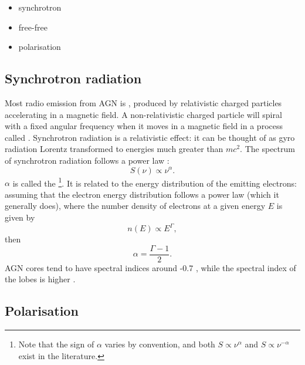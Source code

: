     \begin{itemize}
        \item synchrotron
        \item free-free
        \item polarisation
    \end{itemize}

    \subsection{Synchrotron radiation}
    \label{sec:synchrotron}

        Most radio emission from AGN is , produced by relativistic charged particles accelerating in a magnetic field. A non-relativistic charged particle will spiral with a fixed angular frequency when it moves in a magnetic field in a process called . Synchrotron radiation is a relativistic effect: it can be thought of as gyro radiation Lorentz transformed to energies much greater than $mc^2$. The spectrum of synchrotron radiation follows a power law \citep{condon_essential_2016}:
        \begin{equation}
            \label{eq:spectral-index}
            S(\nu) \propto \nu^{\alpha}.
        \end{equation}
        $\alpha$ is called the \footnote{Note that the sign of $\alpha$ varies by convention, and both $S \propto \nu^{\alpha}$ and $S \propto \nu^{-\alpha}$ exist in the literature.}. It is related to the energy distribution of the emitting electrons: assuming that the electron energy distribution follows a power law (which it generally does\citeneeded), where the number density of electrons at a given energy $E$ is given by
        \begin{equation}
            n(E) \propto E^\Gamma,
        \end{equation}
        then
        \begin{equation}
            \alpha = \frac{\Gamma - 1}{2}.
        \end{equation}
        AGN cores tend to have spectral indices around -0.7 \citeneeded, while the spectral index of the lobes is higher \citeneeded.


    \subsection{Polarisation}
    \label{sec:polarisation}


